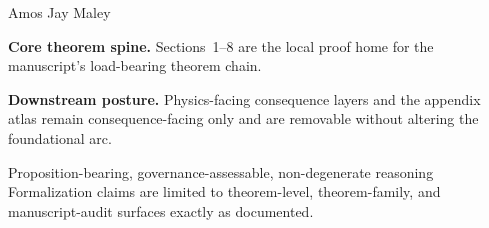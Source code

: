 \hypersetup{pageanchor=false}
\begin{titlepage}
\thispagestyle{empty}

\begin{center}
\vspace*{1.2cm}
{\small\textsc{}\par}
\vspace{1.35cm}
{\fontsize{34}{38}\selectfont\itshape \ProjectTitleWords\par}
\vspace{0.4cm}
{\Large\bfseries \ProjectSubtitle\par}
\vspace{0.95cm}
{\large Amos Jay Maley\par}
\vspace{0.18cm}
{\normalsize \ProjectDate\par}
\end{center}

\vspace{1.05cm}
\begin{center}
\begin{minipage}{0.82\textwidth}
\begin{tcolorbox}[colback=black!1!white,colframe=black!55,boxrule=0.5pt,arc=1.5pt,left=12pt,right=12pt,top=10pt,bottom=10pt]
\small
\textbf{Core theorem spine.} Sections~1--8 are the local proof home for the manuscript's load-bearing theorem chain.

\medskip
\textbf{Downstream posture.} Physics-facing consequence layers and the appendix atlas remain consequence-facing only and are removable without altering the foundational arc.
\end{tcolorbox}
\end{minipage}
\end{center}

\vfill

\begin{center}
{\small Proposition-bearing, governance-assessable, non-degenerate reasoning}\\[4pt]
{\small Formalization claims are limited to theorem-level, theorem-family, and manuscript-audit surfaces exactly as documented.}
\end{center}

\end{titlepage}
\hypersetup{pageanchor=true}
